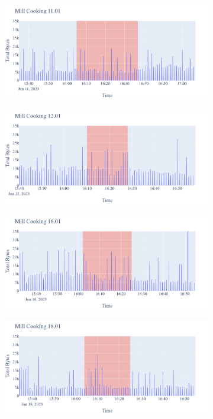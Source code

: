 \begin{figure}[H]
\begin{subfigure}[b]{0.47\textwidth}
        \centering
        \includegraphics[width=1.2\hsize]{figures/Mill_Cooking_Bytes_11.01.png}
    \end{subfigure}
    \begin{subfigure}[b]{0.47\textwidth}
        \centering
        \includegraphics[width=1.2\hsize]{figures/Mill_Cooking_Bytes_12.01.png}
    \end{subfigure}
    \begin{subfigure}[b]{0.47\textwidth}
        \centering
        \includegraphics[width=1.2\hsize]{figures/Mill_Cooking_Bytes_16.01.png}
    \end{subfigure}
    \begin{subfigure}[b]{0.47\textwidth}
        \centering
        \includegraphics[width=1.2\hsize]{figures/Mill_Cooking_Bytes_18.01.png}

\end{subfigure}
\end{figure}

